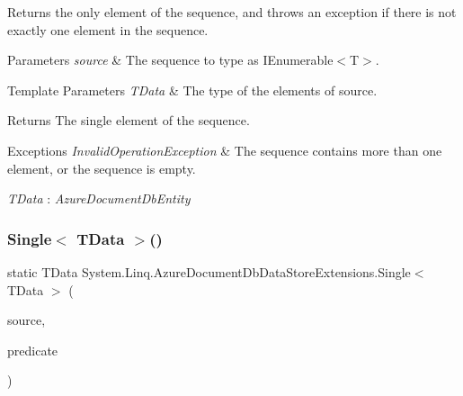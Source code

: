 Returns the only element of the sequence, and throws an exception if there is not exactly one element in the sequence. 


\begin{DoxyParams}{Parameters}
{\em source} & The sequence to type as I\+Enumerable$<$\+T$>$.\\
\hline
\end{DoxyParams}

\begin{DoxyTemplParams}{Template Parameters}
{\em T\+Data} & The type of the elements of source.\\
\hline
\end{DoxyTemplParams}
\begin{DoxyReturn}{Returns}
The single element of the sequence.
\end{DoxyReturn}

\begin{DoxyExceptions}{Exceptions}
{\em Invalid\+Operation\+Exception} & The sequence contains more than one element, or the sequence is empty.\\
\hline
\end{DoxyExceptions}
\begin{Desc}
\item[Type Constraints]\begin{description}
\item[{\em T\+Data} : {\em Azure\+Document\+Db\+Entity}]\end{description}
\end{Desc}
\mbox{\label{classSystem_1_1Linq_1_1AzureDocumentDbDataStoreExtensions_a88615fafe8c7bb0f9a0804eb4e4f0472}} 
\subsubsection{\texorpdfstring{Single$<$ T\+Data $>$()}{Single< TData >()}\hspace{0.1cm}{\footnotesize\ttfamily [2/2]}}
{\footnotesize\ttfamily static T\+Data System.\+Linq.\+Azure\+Document\+Db\+Data\+Store\+Extensions.\+Single$<$ T\+Data $>$ (\begin{DoxyParamCaption}\item[{this \hyperlink{classCqrs_1_1Azure_1_1DocumentDb_1_1DataStores_1_1AzureDocumentDbDataStore}{Azure\+Document\+Db\+Data\+Store}$<$ T\+Data $>$}]{source,  }\item[{Func$<$ T\+Data, bool $>$}]{predicate }\end{DoxyParamCaption})\hspace{0.3cm}{\ttfamily [static]}}




